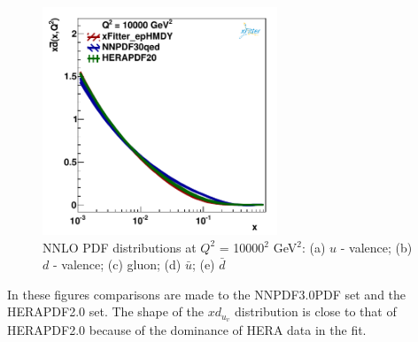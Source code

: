 \begin{figure}
\includegraphics[width=7cm]{plots/dbar_10000.pdf} 
\caption{NNLO PDF distributions at $Q^{2}$ = 10000$^{2}$ GeV$^{2}$: (a) $u$ - valence; (b) $d$ - valence; (c) gluon; (d) $\bar{u}$; (e) $\bar{d}$}
\label{PDF_10000GeV}
\end{figure}
In these figures comparisons are made to the NNPDF3.0PDF set and the HERAPDF2.0 set.
The shape of the $xd_{u_v}$ distribution is close to that of HERAPDF2.0 
because of the dominance of HERA data in the fit. 


